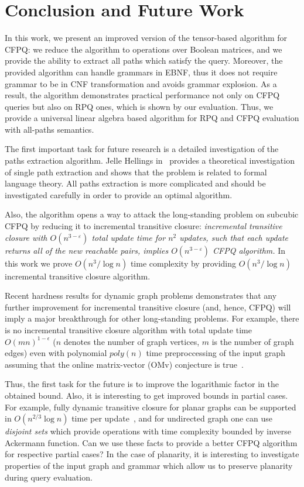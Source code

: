 \section{Conclusion and Future Work}

In this work, we present an improved version of the tensor-based algorithm for CFPQ: we reduce the algorithm to operations over Boolean matrices, and we provide the ability to extract all paths which satisfy the query.
Moreover, the provided algorithm can handle grammars in EBNF, thus it does not require grammar to be in CNF transformation and avoids grammar explosion.
As a result, the algorithm demonstrates practical performance not only on CFPQ queries but also on RPQ ones, which is shown by our evaluation. 
Thus, we provide a universal linear algebra based algorithm for RPQ and CFPQ evaluation with all-paths semantics.

The first important task for future research is a detailed investigation of the paths extraction algorithm.
Jelle Hellings in~\cite{!!!} provides a theoretical investigation of single path extraction and shows that the problem is related to formal language theory.
All paths extraction is more complicated and should be investigated carefully in order to provide an optimal algorithm.

Also, the algorithm opens a way to attack the long-standing problem on subcubic CFPQ by reducing it to incremental transitive closure: \textit{incremental transitive closure with $O(n^{3-\varepsilon})$ total update time for $n^2$ updates, such that each update returns all of the new reachable pairs, implies $O(n^{3-\varepsilon})$ CFPQ algorithm.}
In this work we prove $O(n^3/\log{n})$ time complexity by providing $O(n^3/\log{n})$ incremental transitive closure algorithm. 

Recent hardness results for dynamic graph problems demonstrates that any further improvement for incremental transitive closure (and, hence, CFPQ)  will imply a major breakthrough for other long-standing problems. For example, there is no incremental transitive closure algorithm with total update time $O{(mn)}^{1-\epsilon}$ ($n$ denotes the number of graph vertices, $m$ is the number of graph edges) even with polynomial $poly(n)$ time preproccessing of the input graph assuming that the online matrix-vector (OMv) conjecture is true~\cite{10.1145/2746539.2746609}. 


Thus, the first task for the future is to improve the logarithmic factor in the obtained bound.
Also, it is interesting to get improved bounds in partial cases.
For example, fully dynamic transitive closure for planar graphs can be supported in $O(n^{2/3}\log{n})$ time per update~\cite{10.1007/3-540-57273-2_72}, and for undirected graph one can use \textit{disjoint sets} which provide operations with time complexity bounded by inverse Ackermann function.
Can we use these facts to provide a better CFPQ algorithm for respective partial cases? 
In the case of planarity, it is interesting to investigate properties of the input graph and grammar which allow us to preserve planarity during query evaluation.


